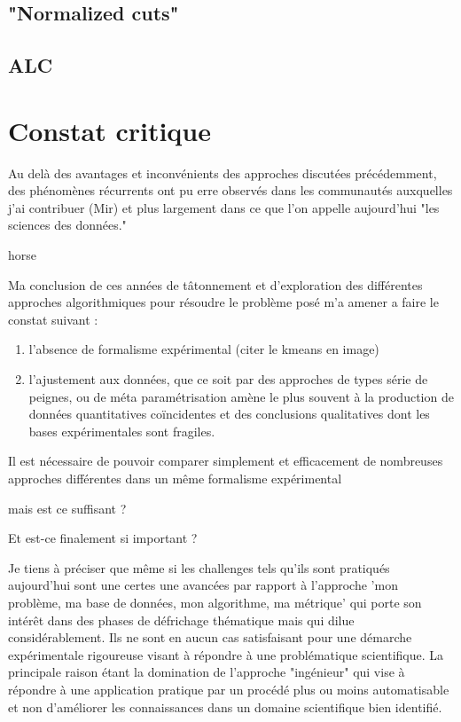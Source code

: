 \subsection{"Normalized cuts"}

\subsection{ALC}



\section{Constat critique}

Au delà des avantages et inconvénients des approches discutées précédemment, des phénomènes récurrents ont pu erre observés dans les communautés auxquelles j'ai contribuer (Mir) et plus largement dans ce que l'on appelle aujourd'hui "les sciences des données."

horse

Ma conclusion de ces années de tâtonnement et d'exploration des différentes approches algorithmiques pour résoudre le problème posé m'a amener a faire le constat suivant :
\begin{enumerate}
  \item l'absence de formalisme expérimental (citer le kmeans en image)
  \item l'ajustement aux données, que ce soit par des approches de types série de peignes, ou de méta paramétrisation amène le plus souvent à la production de données quantitatives coïncidentes et des conclusions qualitatives dont les bases expérimentales sont fragiles.

\end{enumerate}

 Il est nécessaire de pouvoir comparer simplement et efficacement de nombreuses approches différentes dans un même formalisme expérimental

 mais est ce suffisant ?

 Et est-ce finalement si important ?


Je tiens à préciser que même si les challenges tels qu'ils sont pratiqués aujourd'hui sont une certes une avancées par rapport à l'approche 'mon problème, ma base de données, mon algorithme, ma métrique' qui porte son intérêt dans des phases de défrichage thématique mais qui dilue considérablement. Ils  ne sont en aucun cas satisfaisant pour une démarche expérimentale rigoureuse visant à répondre à une problématique scientifique. La principale raison étant la domination de l'approche "ingénieur" qui vise à répondre à une application pratique par un procédé plus ou moins automatisable et non d'améliorer les connaissances dans un domaine scientifique bien identifié.



